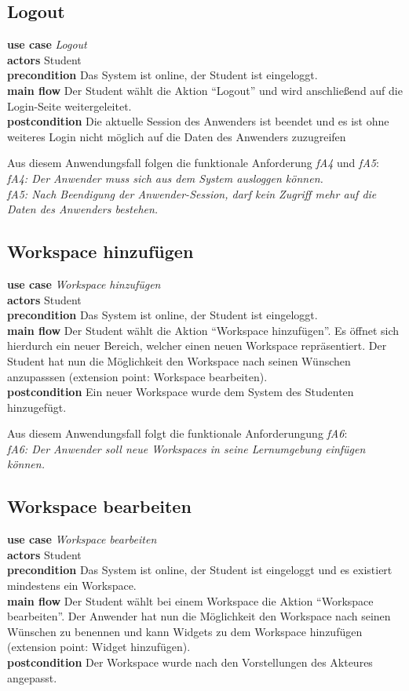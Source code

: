  \subsection{Logout}
\textbf{use case} \emph{Logout}\\
\textbf{actors} Student\\
\textbf{precondition} Das System ist online, der Student ist eingeloggt.\\
\textbf{main flow} Der Student wählt die Aktion "`Logout"' und wird anschließend auf die Login-Seite weitergeleitet.\\
\textbf{postcondition} Die aktuelle Session des Anwenders ist beendet und es ist ohne weiteres Login nicht möglich auf die Daten des Anwenders zuzugreifen 
 
Aus diesem Anwendungsfall folgen die funktionale Anforderung \emph{fA4} und \emph{fA5}:\\
\emph{fA4: Der Anwender muss sich aus dem System ausloggen können.}\\
\emph{fA5: Nach Beendigung der Anwender-Session, darf kein Zugriff mehr auf die Daten des Anwenders bestehen.}
 
\subsection{Workspace hinzufügen}
\textbf{use case} \emph{Workspace hinzufügen}\\
\textbf{actors} Student\\
\textbf{precondition} Das System ist online, der Student ist eingeloggt.\\
\textbf{main flow} Der Student wählt die Aktion "`Workspace hinzufügen"'. Es öffnet sich hierdurch ein neuer Bereich, welcher einen neuen Workspace repräsentiert. Der Student hat nun die Möglichkeit den Workspace nach seinen Wünschen anzupasssen (extension point: Workspace bearbeiten).\\
\textbf{postcondition} Ein neuer Workspace wurde dem System des Studenten hinzugefügt.
 
Aus diesem Anwendungsfall folgt die funktionale Anforderungung \emph{fA6}:\\
\emph{fA6: Der Anwender soll neue Workspaces in seine Lernumgebung einfügen können.}\\
 
\subsection{Workspace bearbeiten}
\textbf{use case} \emph{Workspace bearbeiten}\\
\textbf{actors} Student\\
\textbf{precondition} Das System ist online, der Student ist eingeloggt und es existiert mindestens ein Workspace.\\
\textbf{main flow} Der Student wählt bei einem Workspace die Aktion "`Workspace bearbeiten"'. Der Anwender hat nun die Möglichkeit den Workspace nach seinen Wünschen zu benennen und kann Widgets zu dem Workspace hinzufügen (extension point: Widget hinzufügen).\\
\textbf{postcondition} Der Workspace wurde nach den Vorstellungen des Akteures angepasst.
 
